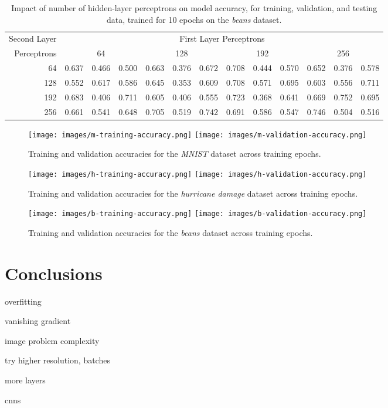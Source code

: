 \documentclass{article}
\begin{document}
\begin{table}[h!]
	\centering
	\caption{Impact of number of hidden-layer perceptrons on model accuracy, for training, validation, and testing data, trained for 10 epochs on the \emph{beans} dataset.}
	\label{tbl:b-2l}
	\begin{tabular}{r|ccc|ccc|ccc|ccc}
		Second Layer & \multicolumn{12}{c}{First Layer Perceptrons} \\
		Perceptrons & \multicolumn{3}{c}{64} & \multicolumn{3}{c}{128} & \multicolumn{3}{c}{192} & \multicolumn{3}{c}{256} \\
		\hline
		64 & 0.637 & 0.466 & 0.500 & 0.663 & 0.376 & 0.672 & 0.708 & 0.444 & 0.570 & 0.652 & 0.376 & 0.578 \\
		128 & 0.552 & 0.617 & 0.586 & 0.645 & 0.353 & 0.609 & 0.708 & 0.571 & 0.695 & 0.603 & 0.556 & 0.711 \\
		192 & 0.683 & 0.406 & 0.711 & 0.605 & 0.406 & 0.555 & 0.723 & 0.368 & 0.641 & 0.669 & 0.752 & 0.695 \\
		256 & 0.661 & 0.541 & 0.648 & 0.705 & 0.519 & 0.742 & 0.691 & 0.586 & 0.547 & 0.746 & 0.504 & 0.516
	\end{tabular}
\end{table}

\begin{figure}[h!]
	\centering
	\texttt{[image: images/m-training-accuracy.png]}
	\texttt{[image: images/m-validation-accuracy.png]}
	\caption{Training and validation accuracies for the \emph{MNIST} dataset across training epochs.}
	\label{fig:m-2l}
\end{figure}

\begin{figure}[h!]
	\centering
	\texttt{[image: images/h-training-accuracy.png]}
	\texttt{[image: images/h-validation-accuracy.png]}
	\caption{Training and validation accuracies for the \emph{hurricane damage} dataset across training epochs.}
	\label{fig:h-2l}
\end{figure}

\begin{figure}[h!]
	\centering
	\texttt{[image: images/b-training-accuracy.png]}
	\texttt{[image: images/b-validation-accuracy.png]}
	\caption{Training and validation accuracies for the \emph{beans} dataset across training epochs.}
	\label{fig:b-2l}
\end{figure}

\FloatBarrier

\section{Conclusions}

overfitting

vanishing gradient

image problem complexity

try higher resolution, batches

more layers

cnns



\end{document}
